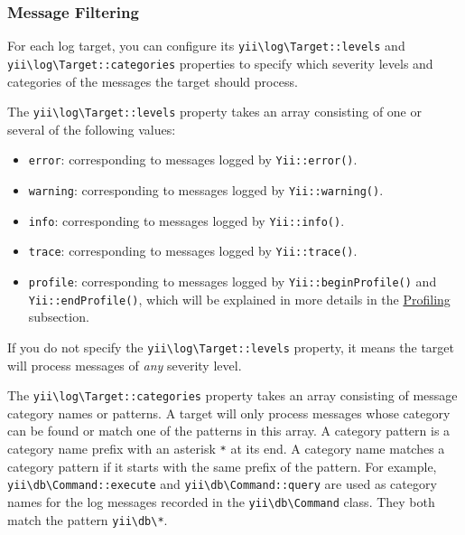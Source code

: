\subsubsection{Message Filtering \label{runtime-logging.md::message-filtering}}
For each log target, you can configure its \texttt{yii{\allowbreak{}\textbackslash}log{\allowbreak{}\textbackslash}Target\allowbreak{}::\allowbreak{}levels} and 
\texttt{yii{\allowbreak{}\textbackslash}log{\allowbreak{}\textbackslash}Target\allowbreak{}::\allowbreak{}categories} properties to specify which severity levels and categories of the messages the target should process.

The \texttt{yii{\allowbreak{}\textbackslash}log{\allowbreak{}\textbackslash}Target\allowbreak{}::\allowbreak{}levels} property takes an array consisting of one or several of the following values:

\begin{itemize}
\item \lstinline|error|: corresponding to messages logged by \texttt{Yii\allowbreak{}::\allowbreak{}error()}.
\item \lstinline|warning|: corresponding to messages logged by \texttt{Yii\allowbreak{}::\allowbreak{}warning()}.
\item \lstinline|info|: corresponding to messages logged by \texttt{Yii\allowbreak{}::\allowbreak{}info()}.
\item \lstinline|trace|: corresponding to messages logged by \texttt{Yii\allowbreak{}::\allowbreak{}trace()}.
\item \lstinline|profile|: corresponding to messages logged by \texttt{Yii\allowbreak{}::\allowbreak{}beginProfile()} and \texttt{Yii\allowbreak{}::\allowbreak{}endProfile()}, which will
be explained in more details in the \hyperref[runtime-logging.md::::performance-profiling]{Profiling} subsection.
\end{itemize}
If you do not specify the \texttt{yii{\allowbreak{}\textbackslash}log{\allowbreak{}\textbackslash}Target\allowbreak{}::\allowbreak{}levels} property, it means the target will process messages
of \textit{any} severity level.

The \texttt{yii{\allowbreak{}\textbackslash}log{\allowbreak{}\textbackslash}Target\allowbreak{}::\allowbreak{}categories} property takes an array consisting of message category names or patterns.
A target will only process messages whose category can be found or match one of the patterns in this array.
A category pattern is a category name prefix with an asterisk \lstinline|*| at its end. A category name matches a category pattern
if it starts with the same prefix of the pattern. For example, \lstinline|yii\db\Command::execute| and \lstinline|yii\db\Command::query|
are used as category names for the log messages recorded in the \texttt{yii{\allowbreak{}\textbackslash}db{\allowbreak{}\textbackslash}Command} class. They both match
the pattern \lstinline|yii\db\*|.

